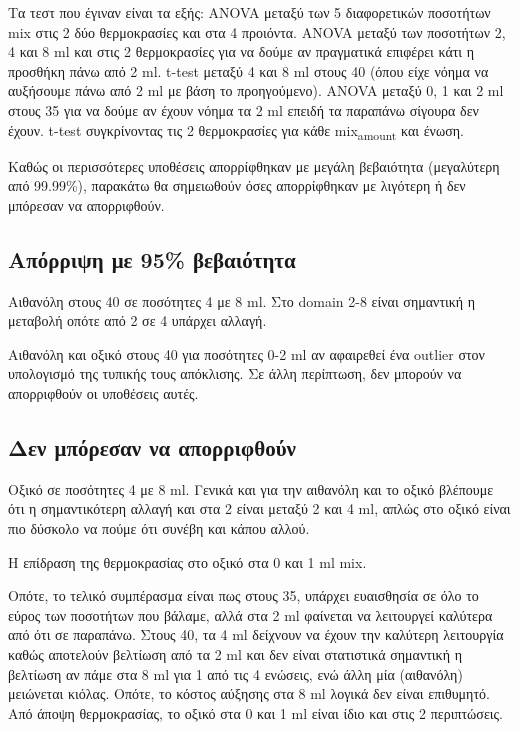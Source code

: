 \documentclass[11pt]{article}
\begin{document}
Τα τεστ που έγιναν είναι τα εξής: ANOVA μεταξύ των 5 διαφορετικών ποσοτήτων mix στις 2 δύο θερμοκρασίες και στα 4 προιόντα. ANOVA μεταξύ των ποσοτήτων 2, 4 και 8 ml και στις 2 θερμοκρασίες για να δούμε αν πραγματικά επιφέρει κάτι η προσθήκη πάνω από 2 ml. t-test μεταξύ 4 και 8 ml στους 40 (όπου είχε νόημα να αυξήσουμε πάνω από 2 ml με βάση το προηγούμενο). ANOVA μεταξύ 0, 1 και 2 ml στους 35 για να δούμε αν έχουν νόημα τα 2 ml επειδή τα παραπάνω σίγουρα δεν έχουν. t-test συγκρίνοντας τις 2 θερμοκρασίες για κάθε mix\textsubscript{amount} και ένωση.

Καθώς οι περισσότερες υποθέσεις απορρίφθηκαν με μεγάλη βεβαιότητα (μεγαλύτερη από 99.99\%), παρακάτω θα σημειωθούν όσες απορρίφθηκαν με λιγότερη ή δεν μπόρεσαν να απορριφθούν.

\subsection{Απόρριψη με 95\% βεβαιότητα}
\label{sec:org655a9dc}
Αιθανόλη στους 40 σε ποσότητες 4 με 8 ml. Στο domain 2-8 είναι σημαντική η μεταβολή οπότε από 2 σε 4 υπάρχει αλλαγή.

Αιθανόλη και οξικό στους 40 για ποσότητες 0-2 ml αν αφαιρεθεί ένα outlier στον υπολογισμό της τυπικής τους απόκλισης. Σε άλλη περίπτωση, δεν μπορούν να απορριφθούν οι υποθέσεις αυτές.

\subsection{Δεν μπόρεσαν να απορριφθούν}
\label{sec:org9ff8a22}
Οξικό σε ποσότητες 4 με 8 ml. Γενικά και για την αιθανόλη και το οξικό βλέπουμε ότι η σημαντικότερη αλλαγή και στα 2 είναι μεταξύ 2 και 4 ml, απλώς στο οξικό είναι πιο δύσκολο να πούμε ότι συνέβη και κάπου αλλού.

Η επίδραση της θερμοκρασίας στο οξικό στα 0 και 1 ml mix.

Οπότε, το τελικό συμπέρασμα είναι πως στους 35, υπάρχει ευαισθησία σε όλο το εύρος των ποσοτήτων που βάλαμε, αλλά στα 2 ml φαίνεται να λειτουργεί καλύτερα από ότι σε παραπάνω. Στους 40, τα 4 ml δείχνουν να έχουν την καλύτερη λειτουργία καθώς αποτελούν βελτίωση από τα 2 ml και δεν είναι στατιστικά σημαντική η βελτίωση αν πάμε στα 8 ml για 1 από τις 4 ενώσεις, ενώ άλλη μία (αιθανόλη) μειώνεται κιόλας. Οπότε, το κόστος αύξησης στα 8 ml λογικά δεν είναι επιθυμητό. Από άποψη θερμοκρασίας, το οξικό στα 0 και 1 ml είναι ίδιο και στις 2 περιπτώσεις.
\end{document}
